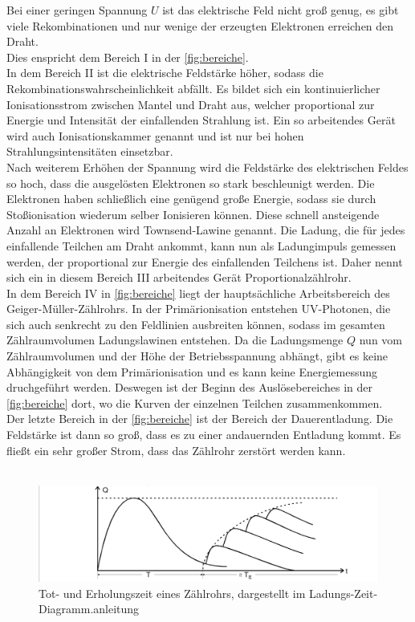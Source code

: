 Bei einer geringen Spannung $U$ ist das elektrische Feld nicht groß genug, es gibt viele Rekombinationen und nur wenige der erzeugten Elektronen erreichen den Draht.\\
Dies enspricht dem Bereich I in der \autoref{fig:bereiche}.\\
In dem Bereich II ist die elektrische Feldstärke höher, sodass die Rekombinationswahrscheinlichkeit abfällt. 
Es bildet sich ein kontinuierlicher Ionisationsstrom zwischen Mantel und Draht aus, welcher proportional zur Energie und Intensität der einfallenden Strahlung ist. 
Ein so arbeitendes Gerät wird auch Ionisationskammer genannt und ist nur bei hohen Strahlungsintensitäten einsetzbar.\\
Nach weiterem Erhöhen der Spannung wird die Feldstärke des elektrischen Feldes so hoch, dass die ausgelösten Elektronen so stark beschleunigt werden. 
Die Elektronen haben schließlich eine genügend große Energie, sodass sie durch Stoßionisation wiederum selber Ionisieren können.
Diese schnell ansteigende Anzahl an Elektronen wird Townsend-Lawine genannt. 
Die Ladung, die für jedes einfallende Teilchen am Draht ankommt, kann nun als Ladungimpuls gemessen werden, der proportional zur Energie des einfallenden Teilchens ist.
Daher nennt sich ein in diesem Bereich III arbeitendes Gerät Proportionalzählrohr.\\
In dem Bereich IV in \autoref{fig:bereiche} liegt der hauptsächliche Arbeitsbereich des Geiger-Müller-Zählrohrs. 
In der Primärionisation entstehen UV-Photonen, die sich auch senkrecht zu den Feldlinien ausbreiten können, sodass im gesamten Zählraumvolumen Ladungslawinen entstehen.
Da die Ladungsmenge $Q$ nun vom Zählraumvolumen und der Höhe der Betriebsspannung abhängt, gibt es keine Abhängigkeit von dem Primärionisation und es kann keine Energiemessung druchgeführt werden.
Deswegen ist der Beginn des Auslösebereiches in der \autoref{fig:bereiche} dort, wo die Kurven der einzelnen Teilchen zusammenkommen.\\
Der letzte Bereich in der \autoref{fig:bereiche} ist der Bereich der Dauerentladung.
Die Feldstärke ist dann so groß, dass es zu einer andauernden Entladung kommt.
Es fließt ein sehr großer Strom, dass das Zählrohr zerstört werden kann.\\
\\
\begin{figure}
    \centering
    \includegraphics[width=\textwidth]{totzeit.png}
    \caption{Tot- und Erholungszeit eines Zählrohrs, dargestellt im Ladungs-Zeit-Diagramm.\cite{4}{anleitung}}
    \label{fig:totzeit}
\end{figure}
